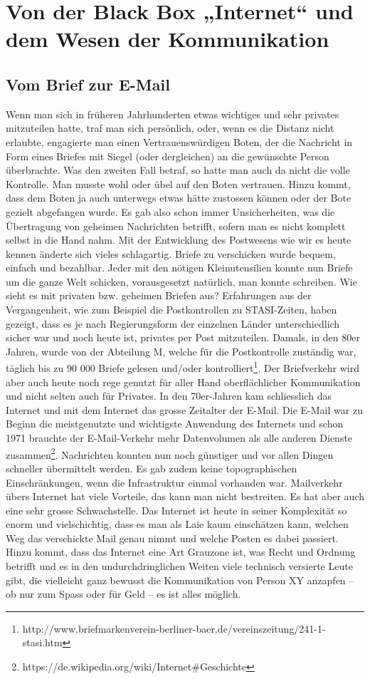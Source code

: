 \section{Von der Black Box „Internet“ und dem Wesen der Kommunikation}
\subsection{Vom Brief zur E-Mail}
Wenn man sich in früheren Jahrhunderten etwas wichtiges und sehr privates mitzuteilen hatte, traf man sich persönlich, oder, wenn es die Distanz nicht erlaubte, engagierte man einen Vertrauenswürdigen Boten, der die Nachricht in Form eines Briefes mit Siegel (oder dergleichen) an die gewünschte Person überbrachte. Was den zweiten Fall betraf, so hatte man auch da nicht die volle Kontrolle. Man musste wohl oder übel auf den Boten vertrauen. Hinzu kommt, dass dem Boten ja auch unterwegs etwas hätte zustossen können oder der Bote gezielt abgefangen wurde. Es gab also schon immer Unsicherheiten, was die Übertragung von geheimen Nachrichten betrifft, sofern man es nicht komplett selbst in die Hand nahm. Mit der Entwicklung des Postwesens wie wir es heute kennen änderte sich vieles schlagartig. Briefe zu verschicken wurde bequem, einfach und bezahlbar. Jeder mit den nötigen Kleinutensilien konnte nun Briefe um die ganze Welt schicken, vorausgesetzt natürlich, man konnte schreiben. Wie sieht es mit privaten bzw. geheimen Briefen aus? Erfahrungen aus der Vergangenheit, wie zum Beispiel die Postkontrollen zu STASI-Zeiten, haben gezeigt, dass es je nach Regierungsform der einzelnen Länder unterschiedlich sicher war und noch heute ist, privates per Post mitzuteilen. Damals, in den 80er Jahren, wurde von der Abteilung M, welche für die Postkontrolle zuständig war, täglich bis zu 90 000 Briefe gelesen und/oder kontrolliert\footnote{http://www.briefmarkenverein-berliner-baer.de/vereinszeitung/241-1-stasi.htm}. Der Briefverkehr wird aber auch heute noch rege genutzt für aller Hand oberflächlicher Kommunikation und nicht selten auch für Privates. In den 70er-Jahren kam schliesslich das Internet und mit dem Internet das grosse Zeitalter der E-Mail. Die E-Mail war zu Beginn die meistgenutzte und wichtigste Anwendung des Internets und schon 1971 brauchte der E-Mail-Verkehr mehr Datenvolumen als alle anderen Dienste zusammen\footnote{https://de.wikipedia.org/wiki/Internet\#Geschichte}. Nachrichten konnten nun noch günstiger und vor allen Dingen schneller übermittelt werden. Es gab zudem keine topographischen Einschränkungen, wenn die Infrastruktur einmal vorhanden war. Mailverkehr übers Internet hat viele Vorteile, das kann man nicht bestreiten. Es hat aber auch eine sehr grosse Schwachstelle. Das Internet ist heute in seiner Komplexität so enorm und vielschichtig, dass es man als Laie kaum einschätzen kann, welchen Weg das verschickte Mail genau nimmt und welche Posten es dabei passiert. Hinzu kommt, dass das Internet eine Art Grauzone ist, was Recht und Ordnung betrifft und es in den undurchdringlichen Weiten viele technisch versierte Leute gibt, die vielleicht ganz bewusst die Kommunikation von Person XY anzapfen – ob nur zum Spass oder für Geld – es ist alles möglich.

